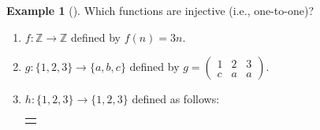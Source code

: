 \documentclass[10pt,]{book}
\theoremstyle{plain}
\theoremstyle{definition}
\theoremstyle{definition}
\newtheorem{example}[theorem]{Example}
\theoremstyle{definition}
\numberwithin{equation}{chapter}
\newlength{\panelmax}
\def\Z{\mathbb Z}
\newcommand{\amp}{&}
\begin{document}
\begin{example}[]\label{example-31}
\hypertarget{p-2132}{}%
Which functions are injective (i.e., one-to-one)?%
\par
\hypertarget{p-2133}{}%
\leavevmode%
\begin{enumerate}
\item\hypertarget{li-378}{}\(f:\Z \to \Z\) defined by \(f(n) = 3n\).%
\item\hypertarget{li-379}{}\(g: \{1,2,3\} \to \{a,b,c\}\) defined by \(g = \begin{pmatrix}1 \amp 2 \amp 3 \\ c \amp a \amp a \end{pmatrix}\).%
\item\hypertarget{li-380}{}\hypertarget{p-2134}{}%
\(h:\{1,2,3\} \to \{1,2,3\}\) defined as follows:%
{%
\setlength{\panelmax}{0pt}
\ifdefined\panelboxAimage\else\newsavebox{\panelboxAimage}\fi%
\begin{lrbox}{\panelboxAimage}
\end{lrbox}
\ifdefined\phAimage\else\newlength{\phAimage}\fi%
\setlength{\phAimage}{\ht\panelboxAimage+\dp\panelboxAimage}
\settototalheight{\phAimage}{\usebox{\panelboxAimage}}
\setlength{\panelmax}{\maxof{\panelmax}{\phAimage}}
\leavevmode%
\setlength{\tabcolsep}{0\linewidth}
\par\medskip\noindent
\hspace*{0.4\linewidth}%
\begin{tabular}{@{}*{1}{c}@{}}
\begin{minipage}[c][\panelmax][t]{0.2\linewidth}\usebox{\panelboxAimage}\end{minipage}\end{tabular}\\
}%
\end{enumerate}
%
\par\smallskip%

\end{example}
\end{document}
